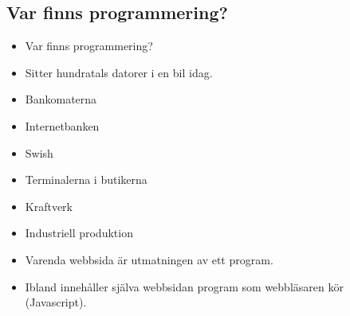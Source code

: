\subsection{Var finns programmering?}


\begin{frame}
  \begin{exercise}
    \begin{itemize}
      \item Var finns programmering?
    \end{itemize}
  \end{exercise}
\end{frame}

\begin{frame}
  \begin{example}[Fordon]
    \begin{itemize}
      \item Sitter hundratals datorer i en bil idag.
    \end{itemize}
  \end{example}

  \begin{example}
    \begin{itemize}
      \item Bankomaterna
      \item Internetbanken
      \item Swish
      \item Terminalerna i butikerna
    \end{itemize}
  \end{example}

  \begin{example}
    \begin{itemize}
      \item Kraftverk
      \item Industriell produktion
    \end{itemize}
  \end{example}
\end{frame}

\begin{frame}
  \begin{example}
    \begin{itemize}
      \item Varenda webbsida är utmatningen av ett program.
      \item Ibland innehåller själva webbsidan program som webbläsaren kör 
        (Javascript).
    \end{itemize}
  \end{example}
\end{frame}

